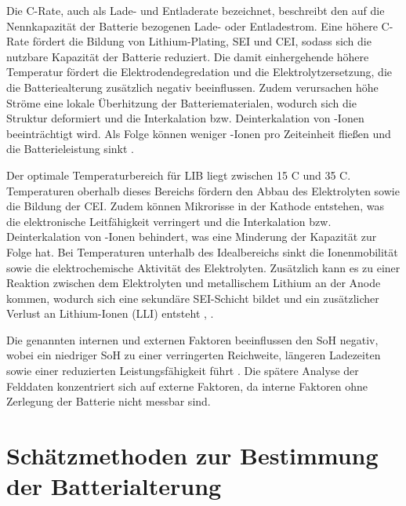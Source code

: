 \par
Die C-Rate, auch als Lade- und Entladerate bezeichnet, beschreibt den auf die Nennkapazität der Batterie bezogenen Lade- oder Entladestrom. Eine höhere C-Rate fördert die Bildung von Lithium-Plating, \acs{SEI} und \acs{CEI}, sodass sich die nutzbare Kapazität der Batterie reduziert. Die damit einhergehende höhere Temperatur fördert die Elektrodendegredation und die Elektrolytzersetzung, die die Batteriealterung zusätzlich negativ beeinflussen. Zudem verursachen höhe Ströme eine lokale Überhitzung der Batteriematerialen, wodurch sich die Struktur deformiert und die Interkalation bzw. Deinterkalation von -Ionen beeinträchtigt wird. Als Folge können weniger -Ionen pro Zeiteinheit fließen und die Batterieleistung sinkt  \cite{urlIdBatterieNiedrigeTemperaturenLithiumBatterien}.
\par
Der optimale Temperaturbereich für \acs{LIB} liegt zwischen 15 \textdegree C und 35 \textdegree C. Temperaturen oberhalb dieses Bereichs fördern den Abbau des Elektrolyten sowie die Bildung der \acs{CEI}. Zudem können Mikrorisse in der Kathode entstehen, was die elektronische Leitfähigkeit verringert und die Interkalation bzw. Deinterkalation von -Ionen behindert, was eine Minderung der Kapazität zur Folge hat. Bei Temperaturen unterhalb des Idealbereichs sinkt die Ionenmobilität sowie die elektrochemische Aktivität des Elektrolyten. Zusätzlich kann es zu einer Reaktion zwischen dem Elektrolyten und metallischem Lithium an der Anode kommen, wodurch sich eine sekundäre \acs{SEI}-Schicht bildet und ein zusätzlicher Verlust an Lithium-Ionen (LLI) entsteht \cite{urlIdBatterieAlterungTemperatur}, \cite{urlIdBatterieAlterungTemperatur2}.
\par
Die genannten internen und externen Faktoren beeinflussen den \acs{SoH} negativ, wobei ein niedriger \acs{SoH} zu einer verringerten Reichweite, längeren Ladezeiten sowie einer reduzierten Leistungsfähigkeit führt \cite{articleAlterungLithiumBatterien}. Die spätere Analyse der Felddaten konzentriert sich auf externe Faktoren, da interne Faktoren ohne Zerlegung der Batterie nicht messbar sind.
\pagebreak

\section{Schätzmethoden zur Bestimmung der Batterialterung}

